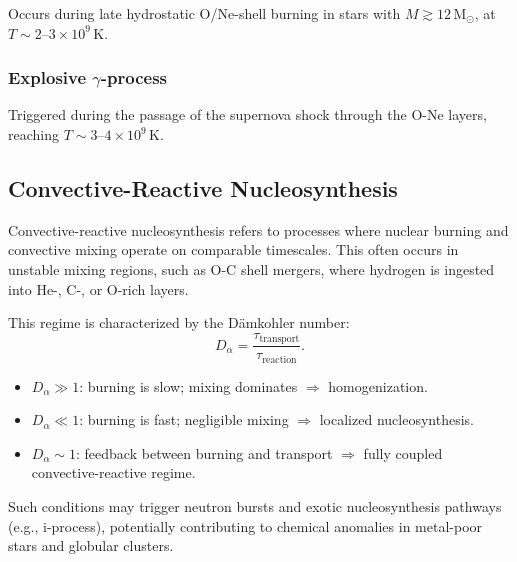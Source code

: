 Occurs during late hydrostatic O/Ne-shell burning in stars with \(M \gtrsim 12\,\mathrm{M}_\odot\), at $T \sim 2\text{–}3\times10^9\,\mathrm{K}$.

\subsubsection{Explosive \texorpdfstring{$\gamma$-process}{gamma-process}}

Triggered during the passage of the supernova shock through the O-Ne layers, reaching $T \sim 3\text{–}4\times10^9\,\mathrm{K}$.

\subsection{Convective-Reactive Nucleosynthesis}

Convective-reactive nucleosynthesis refers to processes where nuclear burning and convective mixing operate on comparable timescales. This often occurs in unstable mixing regions, such as O-C shell mergers, where hydrogen is ingested into He-, C-, or O-rich layers.

This regime is characterized by the Dämkohler number:
\begin{equation}
D_\alpha = \frac{\tau_{\mathrm{transport}}}{\tau_{\mathrm{reaction}}}.
\end{equation}

\begin{itemize}
\item $D_\alpha \gg 1$: burning is slow; mixing dominates $\Rightarrow$ homogenization.
\item $D_\alpha \ll 1$: burning is fast; negligible mixing $\Rightarrow$ localized nucleosynthesis.
\item $D_\alpha \sim 1$: feedback between burning and transport $\Rightarrow$ fully coupled convective-reactive regime.
\end{itemize}

Such conditions may trigger neutron bursts and exotic nucleosynthesis pathways (e.g., i-process), potentially contributing to chemical anomalies in metal-poor stars and globular clusters.